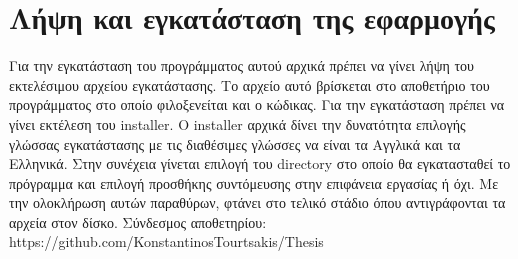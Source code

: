







\section{Λήψη και εγκατάσταση της εφαρμογής}
Για την εγκατάσταση του προγράμματος αυτού αρχικά πρέπει να γίνει λήψη του εκτελέσιμου
αρχείου εγκατάστασης. Το αρχείο αυτό βρίσκεται στο αποθετήριο του προγράμματος στο οποίο
φιλοξενείται και ο κώδικας. Για την εγκατάσταση πρέπει να γίνει εκτέλεση του installer. Ο
installer αρχικά δίνει την δυνατότητα επιλογής γλώσσας εγκατάστασης με τις διαθέσιμες γλώσσες
να είναι τα Αγγλικά και τα Ελληνικά. Στην συνέχεια γίνεται επιλογή του directory στο οποίο θα
εγκατασταθεί το πρόγραμμα και επιλογή προσθήκης συντόμευσης στην επιφάνεια εργασίας ή όχι. Με
την ολοκλήρωση αυτών παραθύρων, φτάνει στο τελικό στάδιο όπου αντιγράφονται τα αρχεία στον δίσκο.
Σύνδεσμος αποθετηρίου: https://github.com/KonstantinosTourtsakis/Thesis